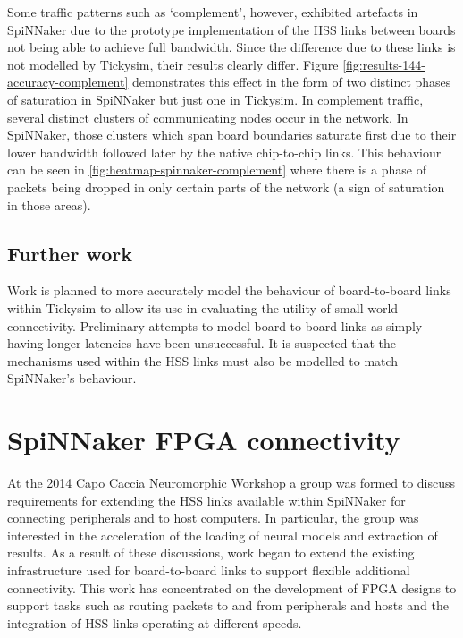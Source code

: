 			Some traffic patterns such as `complement', however, exhibited artefacts
			in SpiNNaker due to the prototype implementation of the HSS links between
			boards not being able to achieve full bandwidth. Since the difference due
			to these links is not modelled by Tickysim, their results clearly differ.
			Figure \ref{fig:results-144-accuracy-complement} demonstrates this effect
			in the form of two distinct phases of saturation in SpiNNaker but just one
			in Tickysim. In complement traffic, several distinct clusters of
			communicating nodes occur in the network. In SpiNNaker, those clusters
			which span board boundaries saturate first due to their lower bandwidth
			followed later by the native chip-to-chip links. This behaviour can be
			seen in \ref{fig:heatmap-spinnaker-complement} where there is a phase of
			packets being dropped in only certain parts of the network (a sign of
			saturation in those areas).
		
		\subsection{Further work}
			
			
			Work is planned to more accurately model the behaviour of board-to-board
			links within Tickysim to allow its use in evaluating the utility of small
			world connectivity. Preliminary attempts to model board-to-board links as
			simply having longer latencies have been unsuccessful. It is suspected
			that the mechanisms used within the HSS links must also be modelled to
			match SpiNNaker's behaviour.
	
	
	\section{SpiNNaker FPGA connectivity}
		
		
		At the 2014 Capo Caccia Neuromorphic Workshop a group was formed to discuss
		requirements for extending the HSS links available within SpiNNaker for
		connecting peripherals and to host computers. In particular, the group was
		interested in the acceleration of the loading of neural models and
		extraction of results.  As a result of these discussions, work began to
		extend the existing infrastructure used for board-to-board links to support
		flexible additional connectivity. This work has concentrated on the
		development of FPGA designs to support tasks such as routing packets to and
		from peripherals and hosts and the integration of HSS links operating at
		different speeds.
		
